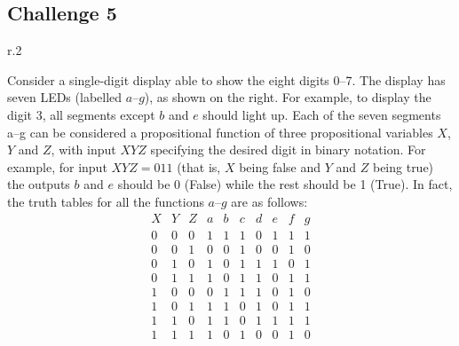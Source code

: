 \documentclass[12pt]{article}
\begin{document}
\subsection*{Challenge 5}
\begin{wrapfigure}[12]{r}{.2\textwidth}
\begin{center}
\end{center}
\end{wrapfigure}
Consider a single-digit display able to show the eight digits 0--7.
The display has seven LEDs (labelled $a$--$g$),
as shown on the right.
For example, to display the digit 3, all segments except
$b$ and $e$ should light up.
Each of the seven segments a--g can be considered a propositional
function of three propositional variables $X$, $Y$ and $Z$, with
input $XYZ$ specifying the desired digit in binary notation.
For example, for input $XYZ = 011$ (that is, $X$ being false and
$Y$ and $Z$ being true) the outputs $b$ and $e$ should be 0
(False) while the rest should be 1 (True).
In fact, the truth tables for all the functions $a$--$g$ are as
follows:
\[
\begin{array}{ccc|ccccccc}
   X & Y & Z & a & b & c & d & e & f & g
\\ \hline
   0 & 0 & 0 & 1 & 1 & 1 & 0 & 1 & 1 & 1
\\ 0 & 0 & 1 & 0 & 0 & 1 & 0 & 0 & 1 & 0
\\ 0 & 1 & 0 & 1 & 0 & 1 & 1 & 1 & 0 & 1
\\ 0 & 1 & 1 & 1 & 0 & 1 & 1 & 0 & 1 & 1
\\ 1 & 0 & 0 & 0 & 1 & 1 & 1 & 0 & 1 & 0
\\ 1 & 0 & 1 & 1 & 1 & 0 & 1 & 0 & 1 & 1
\\ 1 & 1 & 0 & 1 & 1 & 0 & 1 & 1 & 1 & 1
\\ 1 & 1 & 1 & 1 & 0 & 1 & 0 & 0 & 1 & 0
\end{array}
\]
\end{document}
